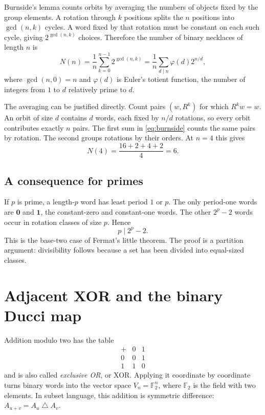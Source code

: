 \documentclass[11pt]{article}
\theoremstyle{definition}
\newcommand{\F}{\mathbb F_2}
\newcommand{\one}{\mathbf 1}
\newcommand{\zero}{\mathbf 0}
\numberwithin{equation}{section}
\begin{document}
Burnside's lemma counts orbits by averaging the numbers of objects fixed
by the group elements. A rotation through $k$ positions splits the $n$
positions into $\gcd(n,k)$ cycles. A word fixed by that rotation must
be constant on each such cycle, giving $2^{\gcd(n,k)}$ choices.
Therefore the number of binary necklaces of length $n$ is
\begin{equation}\label{eq:burnside}
 N(n)=\frac1n\sum_{k=0}^{n-1}2^{\gcd(n,k)}
 =\frac1n\sum_{d\mid n}\varphi(d)2^{n/d},
\end{equation}
where $\gcd(n,0)=n$ and $\varphi(d)$ is Euler's totient function, the
number of integers from $1$ to $d$ relatively prime to $d$.

The averaging can be justified directly. Count pairs $(w,R^k)$ for
which $R^kw=w$. An orbit of size $d$ contains $d$ words, each fixed
by $n/d$ rotations, so every orbit contributes exactly $n$ pairs.
The first sum in \eqref{eq:burnside} counts the same pairs by rotation.
The second groups rotations by their orders. At $n=4$ this gives
\[
 N(4)=\frac{16+2+4+2}{4}=6.
\]

\subsection{A consequence for primes}

If $p$ is prime, a length-$p$ word has least period $1$ or $p$.
The only period-one words are $\zero$ and $\one$, the constant-zero
and constant-one words. The other $2^p-2$ words occur in rotation
classes of size $p$. Hence
\[
 p\mid 2^p-2.
\]
This is the base-two case of Fermat's little theorem. The proof is a
partition argument: divisibility follows because a set has been divided
into equal-sized classes.

\section{Adjacent XOR and the binary Ducci map}\label{sec:ducci}

Addition modulo two has the table
\[
 \begin{array}{c|cc}
 +&0&1\\\hline
 0&0&1\\
 1&1&0
 \end{array}
\]
and is also called \emph{exclusive OR}, or XOR. Applying it coordinate
by coordinate turns binary words into the vector space $V_n=\F^n$,
where $\F$ is the field with two elements. In subset language, this
addition is symmetric difference:
$A_{u+v}=A_u\mathbin{\triangle}A_v$.
\end{document}

